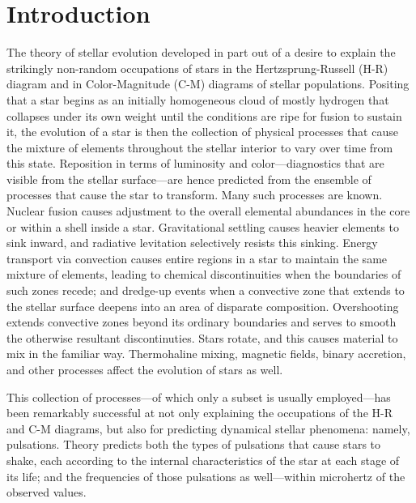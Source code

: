 \documentclass[twocolumn,twocolappendix]{aastex6}
\begin{document}


\section{Introduction} %

The theory of stellar evolution developed in part out of a desire to explain the strikingly non-random occupations of stars in the Hertzsprung-Russell (H-R) diagram and in Color-Magnitude (C-M) diagrams of stellar populations. %
Positing that a star begins as an initially homogeneous cloud of mostly hydrogen that collapses under its own weight until the conditions are ripe for fusion to sustain it, the evolution of a star is then the collection of physical processes that cause the mixture of elements throughout the stellar interior to vary over time from this state. Reposition in terms of luminosity and color---diagnostics that are visible from the stellar surface---are hence predicted from the ensemble of processes that cause the star to transform. 
Many such processes are known. 
Nuclear fusion causes adjustment to the overall elemental abundances in the core or within a shell inside a star. 
Gravitational settling causes heavier elements to sink inward, and radiative levitation selectively resists this sinking. 
Energy transport via convection causes entire regions in a star to maintain the same mixture of elements, leading to chemical discontinuities when the boundaries of such zones recede; and dredge-up events when a convective zone that extends to the stellar surface deepens into an area of disparate composition. 
Overshooting extends convective zones beyond its ordinary boundaries and serves to smooth the otherwise resultant discontinuties. 
Stars rotate, and this causes material to mix in the familiar way. 
Thermohaline mixing, magnetic fields, binary accretion, and other processes affect the evolution of stars as well. 

This collection of processes---of which only a subset is usually employed---has been remarkably successful at not only explaining the occupations of the H-R and C-M diagrams, but also for predicting dynamical stellar phenomena: namely, pulsations. 
Theory predicts both the types of pulsations that cause stars to shake, each according to the internal characteristics of the star at each stage of its life; and the frequencies of those pulsations as well---within microhertz of the observed values. 
\end{document}

